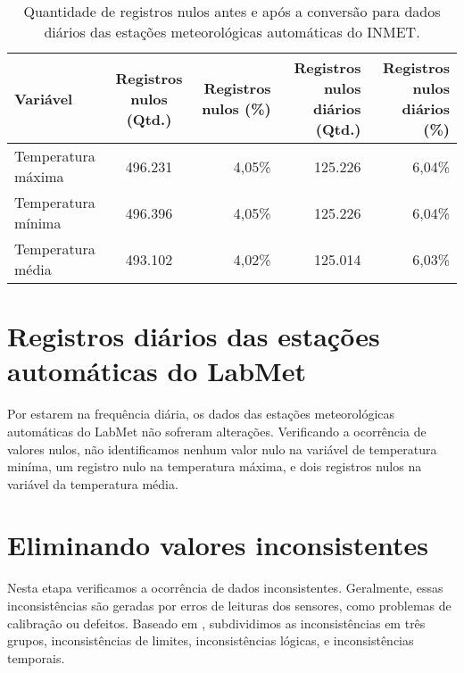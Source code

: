 \begin{table}[H]
\caption{Quantidade de registros nulos antes e após a conversão para dados diários das estações meteorológicas automáticas do INMET.}
\label{tab:estacoes_convencionais_inmet_dados_nulos}
\begin{adjustbox}{width=\textwidth}
\begin{tabular}{|l|c|r|r|r|}
\hline
\textbf{Variável} & \textbf{Registros nulos (Qtd.)} & \textbf{Registros nulos (\%)} & \textbf{Registros nulos diários (Qtd.)} & \textbf{Registros nulos diários (\%)} \\
\hline
Temperatura máxima  & 496.231 & 4,05\% &125.226 & 6,04\% \\
\hline
Temperatura mínima & 496.396 & 4,05\% & 125.226 & 6,04\% \\
\hline
Temperatura média & 493.102 & 4,02\% & 125.014 & 6,03\% \\
\hline
\end{tabular}
\end{adjustbox}
\end{table}

\section{Registros diários das estações automáticas do LabMet}

Por estarem na frequência diária, os dados das estações meteorológicas automáticas do LabMet não sofreram alterações. Verificando a ocorrência de valores nulos, não identificamos nenhum valor nulo na variável de temperatura miníma, um registro nulo na temperatura máxima, e dois registros nulos na variável da temperatura média. 

\section{Eliminando valores inconsistentes}

Nesta etapa verificamos a ocorrência de dados inconsistentes. Geralmente, essas inconsistências são geradas por erros de leituras dos sensores, como problemas de calibração ou defeitos. Baseado em , subdividimos as inconsistências em três grupos, inconsistências de limites, inconsistências lógicas, e inconsistências temporais. 

